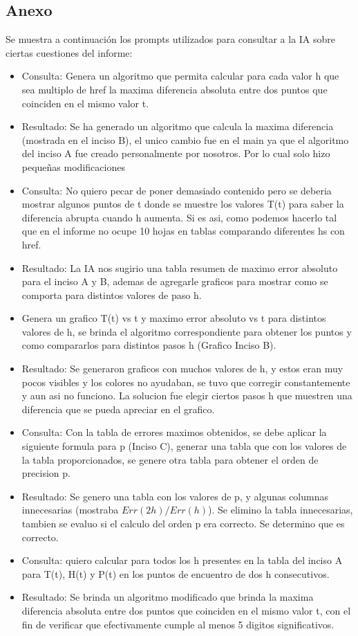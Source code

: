 \subsection{Anexo}

Se muestra a continuación los prompts utilizados para consultar a la IA sobre ciertas cuestiones del informe:

\begin{itemize}
    \item Consulta: Genera un algoritmo que permita calcular para cada valor h que sea multiplo de href la maxima diferencia absoluta entre dos puntos que coinciden en el mismo valor t.
    \item Resultado: Se ha generado un algoritmo que calcula la maxima diferencia (mostrada en el inciso B), el unico cambio fue en el main ya que el algoritmo del inciso A fue creado personalmente por nosotros. Por lo cual solo hizo pequeñas modificaciones
    \item Consulta: No quiero pecar de poner demasiado contenido pero se deberia mostrar algunos puntos de t donde se muestre los valores T(t) para saber la diferencia abrupta cuando h aumenta. Si es asi, como podemos hacerlo tal que en el informe no ocupe 10 hojas en tablas comparando diferentes hs con href. 
    \item Resultado: La IA nos sugirio una tabla resumen de maximo error absoluto para el inciso A y B, ademas de agregarle graficos para mostrar como se comporta para distintos valores de paso h.
    \item Genera un grafico T(t) vs t y maximo error absoluto vs t para distintos valores de h, se brinda el algoritmo correspondiente para obtener los puntos y como compararlos para distintos pasos h (Grafico Inciso B).
    \item Resultado: Se generaron graficos con muchos valores de h, y estos eran muy pocos visibles y los colores no ayudaban, se tuvo que corregir constantemente y aun asi no funciono. La solucion fue elegir ciertos pasos h que muestren una diferencia que se pueda apreciar en el grafico.
    \item Consulta: Con la tabla de errores maximos obtenidos, se debe aplicar la siguiente formula para p (Inciso C), generar una tabla que con los valores de la tabla proporcionados, se genere otra tabla para obtener el orden de precision p.
    \item Resultado: Se genero una tabla con los valores de p, y algunas columnas innecesarias (mostraba $Err(2h) / Err(h)$). Se elimino la tabla innecesarias, tambien se evaluo si el calculo del orden p era correcto. Se determino que es correcto.
    \item Consulta: quiero calcular para todos los h presentes en la tabla del inciso A para T(t), H(t) y P(t) en los puntos de encuentro de dos h consecutivos.
    \item Resultado: Se brinda un algoritmo modificado que brinda la maxima diferencia absoluta entre dos puntos que coinciden en el mismo valor t, con el fin de verificar que efectivamente cumple al menos 5 digitos significativos.

\end{itemize}